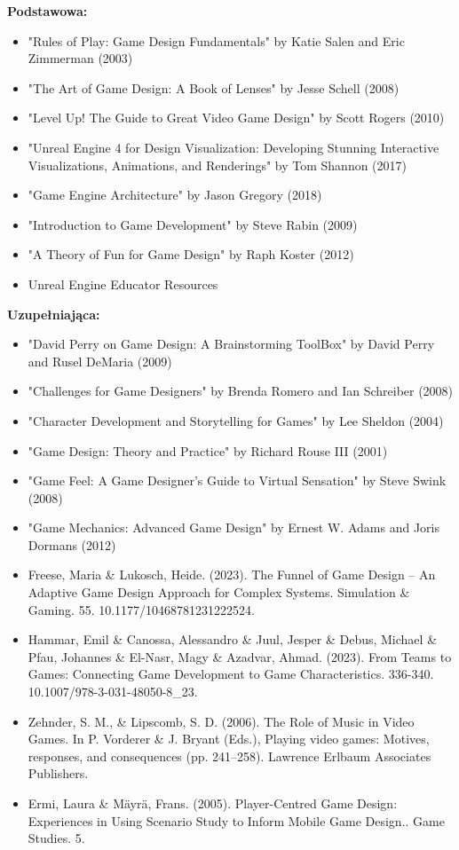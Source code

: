 \documentclass[12pt, a4paper]{article}
\begin{document}
\textbf{Podstawowa:}
\begin{itemize}
  \item "Rules of Play: Game Design Fundamentals" by Katie Salen and Eric Zimmerman (2003)
  \item "The Art of Game Design: A Book of Lenses" by Jesse Schell (2008)
  \item "Level Up! The Guide to Great Video Game Design" by Scott Rogers (2010)
  \item "Unreal Engine 4 for Design Visualization: Developing Stunning Interactive Visualizations, Animations, and Renderings" by Tom Shannon (2017)
  \item "Game Engine Architecture" by Jason Gregory (2018)
  \item "Introduction to Game Development" by Steve Rabin (2009)
  \item "A Theory of Fun for Game Design" by Raph Koster (2012)
  \item Unreal Engine Educator Resources
\end{itemize}

\textbf{Uzupełniająca:}
\begin{itemize}
  \item "David Perry on Game Design: A Brainstorming ToolBox" by David Perry and Rusel DeMaria (2009)
  \item "Challenges for Game Designers" by Brenda Romero and Ian Schreiber (2008)
  \item "Character Development and Storytelling for Games" by Lee Sheldon (2004)
  \item "Game Design: Theory and Practice" by Richard Rouse III (2001)
  \item "Game Feel: A Game Designer's Guide to Virtual Sensation" by Steve Swink (2008)
  \item "Game Mechanics: Advanced Game Design" by Ernest W. Adams and Joris Dormans (2012)
  \item Freese, Maria \& Lukosch, Heide. (2023). The Funnel of Game Design – An Adaptive Game Design Approach for Complex Systems. Simulation \& Gaming. 55. 10.1177/10468781231222524.
  \item Hammar, Emil \& Canossa, Alessandro \& Juul, Jesper \& Debus, Michael \& Pfau, Johannes \& El-Nasr, Magy \& Azadvar, Ahmad. (2023). From Teams to Games: Connecting Game Development to Game Characteristics. 336-340. 10.1007/978-3-031-48050-8\_23.
  \item Zehnder, S. M., \& Lipscomb, S. D. (2006). The Role of Music in Video Games. In P. Vorderer \& J. Bryant (Eds.), Playing video games: Motives, responses, and consequences (pp. 241–258). Lawrence Erlbaum Associates Publishers.
  \item Ermi, Laura \& Mäyrä, Frans. (2005). Player-Centred Game Design: Experiences in Using Scenario Study to Inform Mobile Game Design.. Game Studies. 5.
\end{itemize}
\end{document}
